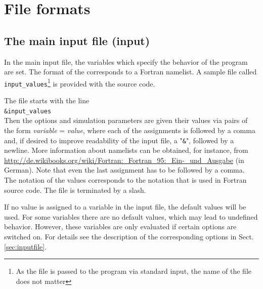 \documentclass[a4paper,10pt]{article}
\begin{document}
\section{File formats}
\label {sec:fileformats}
\subsection{The main input file (input)}
\label{file:main}
In the main input file,  the variables which specify the behavior of the 
program  are set. The format of the corresponds to a Fortran namelist. A sample 
file 
called \texttt{input\_values}\footnote{As the file is passed to the program via 
standard input, the name of the file does not matter} is provided with the 
source code.

The file starts with the line\\
\texttt{\&input\_values}\\

Then the options and simulation parameters are given their values via pairs of 
the form \textit{variable} = \textit{value},
where each of the assignments is followed by a comma and, if desired to improve	 
readability of the input file, a "\texttt{\&}", followed by a newline. More 
information about namelists can be obtained, for instance, from  
\url{http://de.wikibooks.org/wiki/Fortran:\_Fortran\_95:\_Ein-\_und\_Ausgabe} 
(in German). Note that even the last assignment 
has to be followed by a comma. The notation of the values corresponds to the 
notation that is used in Fortran source code. The file is terminated by a slash.

If no value is assigned to a variable in the input file, the default values  
will be used. For some variables  there are no default values, which may lead 
to undefined behavior. However, these variables are only evaluated if certain 
options are switched on. For details see the description of 
the corresponding options in Sect. \ref{sec:inputfile}.
\end{document}
